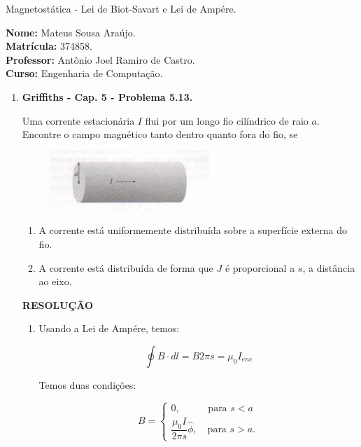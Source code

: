 \documentclass[11pt,a4paper]{article}
\begin{document}
	\begin{center}
		\Large Magnetostática - Lei de Biot-Savart e Lei de Ampére. 
	\end{center}

\begin{flushleft}
\textbf{Nome:} Mateus Sousa Araújo. \\
\textbf{Matrícula:} 374858. \\
\textbf{Professor:} Antônio Joel Ramiro de Castro. \\
\textbf{Curso:} Engenharia de Computação. \\
\end{flushleft}

\begin{enumerate}

\item \textbf{Griffiths - Cap. 5 - Problema 5.13.}

Uma corrente estacionária $I$ flui por um longo fio cilíndrico de raio $a$. Encontre o campo magnético tanto dentro quanto fora do fio, se

\begin{figure}[h]	
\centering %
\includegraphics[width=6cm]{Selection_095.jpg} 
\end{figure}

\begin{enumerate}
\item A corrente está uniformemente distribuída sobre a superfície externa do fio.
\item A corrente está distribuída de forma que $J$ é proporcional a $s$, a distância ao eixo.
\end{enumerate}


\textbf{RESOLUÇÃO}

\begin{enumerate}

\item 

Usando a Lei de Ampére, temos:

$$\displaystyle\oint B \cdot dl = B 2\pi s = \mu_0 I_{enc}$$

Temos duas condições:

$$B = 
		\begin{cases}
			0\textrm{,} \quad \quad \quad \textrm{para } s < a \\
			\displaystyle\dfrac{\mu_0 I}{2\pi s}\hat{\phi}\textrm{,} \, \quad \textrm{para } s > a.
		\end{cases}
$$


\end{enumerate}
\end{enumerate}
\end{document}
